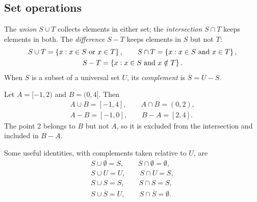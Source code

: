 \subsection{Set operations}
\begin{definition}
The \emph{union} $S\cup T$ collects elements in either set; the \emph{intersection} $S\cap T$ keeps elements in both. The \emph{difference} $S-T$ keeps elements in $S$ but not $T$:
\begin{gather*}
    S\cup T=\left\{x : x\in S\text{ or }x\in T\right\}, \qquad
    S\cap T=\left\{x : x\in S\text{ and }x\in T\right\},\\
    S-T=\left\{x : x\in S\text{ and }x\notin T\right\}.
\end{gather*}
When $S$ is a subset of a universal set $U$, its \emph{complement} is $\overline{S}=U-S$.
\end{definition}

\begin{example}
Let $A=[-1,2)$ and $B=(0,4]$. Then
\begin{gather*}
    A\cup B=[-1,4], \qquad A\cap B=(0,2),\\
    A-B=[-1,0], \qquad B-A=[2,4].
\end{gather*}
The point $2$ belongs to $B$ but not $A$, so it is excluded from the intersection and included in $B-A$.
\end{example}

Some useful identities, with complements taken relative to $U$, are
\begin{gather*}
    S\cup\emptyset=S, \qquad S\cap\emptyset=\emptyset,\\
    S\cup U=U, \qquad S\cap U=S,\\
    S\cup S=S, \qquad S\cap S=S,\\
    S\cup\overline{S}=U, \qquad S\cap\overline{S}=\emptyset.
\end{gather*}
